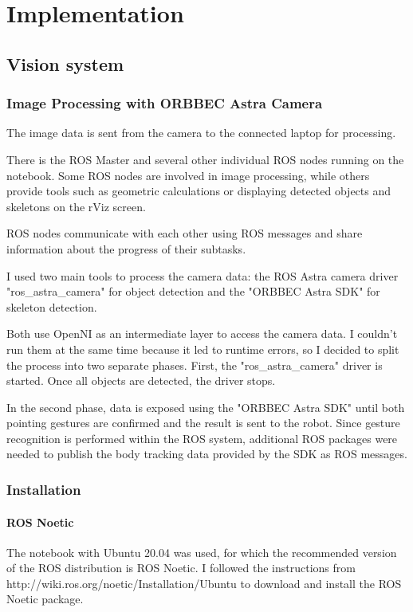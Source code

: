 \chapter{Implementation}

\section{Vision system}

\subsection{Image Processing with ORBBEC Astra Camera}
The image data is sent from the camera to the connected laptop for processing.\par
There is the ROS Master and several other individual ROS nodes running on the notebook. Some ROS nodes are involved in image processing, while others provide tools such as geometric calculations or displaying detected objects and skeletons on the rViz screen.\par
ROS nodes communicate with each other using ROS messages and share information about the progress of their subtasks.\par
I used two main tools to process the camera data: the ROS Astra camera driver "ros\_astra\_camera" for object detection and the "ORBBEC Astra SDK" for skeleton detection.\par
Both use OpenNI as an intermediate layer to access the camera data. I couldn't run them at the same time because it led to runtime errors, so I decided to split the process into two separate phases.
First, the "ros\_astra\_camera" driver is started. Once all objects are detected, the driver stops.\par
In the second phase, data is exposed using the "ORBBEC Astra SDK" until both pointing gestures are confirmed and the result is sent to the robot. Since gesture recognition is performed within the ROS system, additional ROS packages were needed to publish the body tracking data provided by the SDK as ROS messages.\par

\subsection{Installation}

\subsubsection{ROS Noetic}
The notebook with Ubuntu 20.04 was used, for which the recommended version of the ROS distribution is ROS Noetic. I followed the instructions from http://wiki.ros.org/noetic/Installation/Ubuntu to download and install the ROS Noetic package.\par


